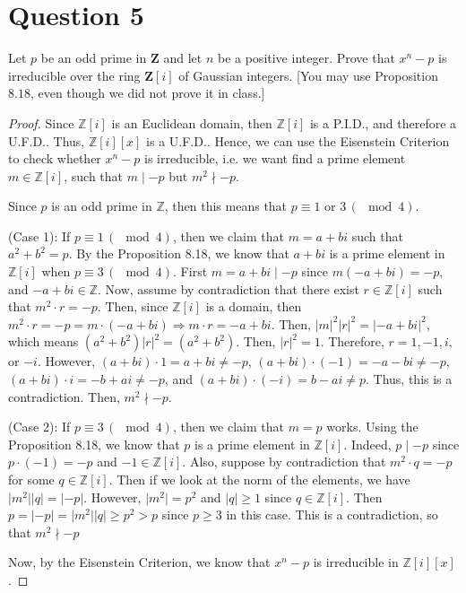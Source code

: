 \section{Question 5}

\begin{question}
    Let $p$ be an odd prime in $\mathbf{Z}$ and let $n$ be a positive integer. Prove that $x^n-p$ is irreducible over the ring $\mathbf{Z}[i]$ of Gaussian integers. [You may use Proposition $8.18$, even though we did not prove it in class.]
\end{question}

\begin{answer}
    \begin{proof}
        Since $\mathbb{Z}[i]$ is an Euclidean domain, then $\mathbb{Z}[i]$ is a P.I.D., and therefore a U.F.D.. Thus, $\mathbb{Z}[i][x]$ is a U.F.D.. Hence, we can use the Eisenstein Criterion to check whether $x^n - p$ is irreducible, i.e. we want find a prime element $m \in \mathbb{Z}[i]$, such that $m \mid -p$ but $m^2 \nmid -p$.
        
        Since $p$ is an odd prime in $\mathbb{Z}$, then this means that $p \equiv 1 \text{ or } 3 \,(\mod 4)$.
        
        (Case 1): If $p \equiv 1 \,(\mod 4)$, then we claim that $m = a+bi$ such that $a^2 + b^2 = p$. By the Proposition 8.18, we know that $a+bi$  is a prime element in $\mathbb{Z}[i]$ when $p \equiv 3 \,(\mod 4)$. First $m = a+bi \mid -p$ since $m (-a+bi) = -p$, and  $-a +bi \in \mathbb{Z}$. Now, assume by contradiction that there exist $r \in \mathbb{Z}[i]$ such that $m^2 \cdot r = -p$. Then, since $\mathbb{Z}[i]$ is a domain, then $m^2 \cdot r = -p = m \cdot (-a + bi) \Rightarrow m \cdot r = -a + bi$. Then, $\lvert m \rvert^2 \lvert r \rvert^2 = \lvert -a + bi \rvert^2$, which means $(a^2 + b^2)\lvert r \rvert^2 = (a^2 + b^2)$. Then, $\lvert r \rvert^2 = 1$. Therefore, $r = 1,-1,i,$ or $-i$. However, $(a+bi)\cdot 1 = a+bi \neq -p$, $(a+bi)\cdot (-1) = -a -bi \neq -p$, $(a+bi)\cdot i = -b + ai \neq -p$, and $(a+bi)\cdot(-i) = b - ai \neq p$. Thus, this is a contradiction. Then, $m^2 \nmid -p$.
        
        (Case 2): If $p \equiv 3 \,(\mod 4)$, then we claim that $m = p$ works. Using the Proposition 8.18, we know that $p$ is a prime element in $\mathbb{Z}[i]$. Indeed, $p \mid -p$ since $p \cdot (-1) = -p$ and $-1 \in \mathbb{Z}[i]$. Also, suppose by contradiction that $m^2 \cdot q = -p$ for some $q \in \mathbb{Z}[i]$. Then if we look at the norm of the elements, we have $\lvert m^2 \rvert \lvert q \rvert = \lvert -p \rvert$. However, $\lvert m^2 \rvert = p^2$ and $\lvert q \rvert \geq 1$ since $q \in \mathbb{Z}[i]$. Then $p = \lvert -p \rvert = \lvert m^2 \rvert \lvert q \rvert \geq p^2 > p$ since $p \geq 3$ in this case. This is a contradiction, so that $m^2 \nmid -p$
        
        Now, by the Eisenstein Criterion, we know that $x^n-p$ is irreducible in $\mathbb{Z}[i][x]$.
    \end{proof}
\end{answer}